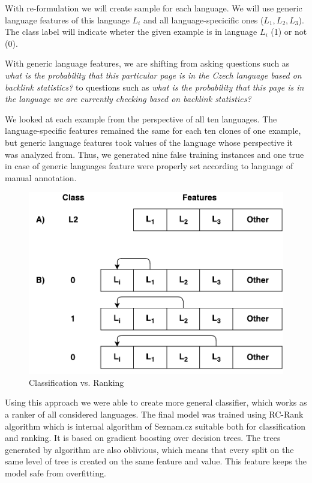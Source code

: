 \documentclass{acm_proc_article-sp}
\begin{document}
  With re-formulation we will create sample for each language.
  We will use generic language features of this language $L_i$ and all language-specicific
  ones ($L_1, L_2, L_3$). The class label will indicate wheter the given example is in language $L_i$ (1) or not (0).


  With generic language features, we are shifting from asking questions such as \textit{what is the probability that 
    this particular page is in the Czech language based on backlink statistics?} to questions 
    such as \textit{what is the probability that this page is in the language we are currently checking 
    based on backlink statistics?} 
 
 We looked at each example from the perspective of all ten languages. The 
  language-specific features remained the same for each ten clones of one example,
  but generic language features took values of the language whose perspective
  it was analyzed from.  Thus, we generated nine false training instances and 
  one true in case of generic languages feature were properly set according to 
  language of manual annotation.

  \begin{figure}
      \caption{Classification vs. Ranking} 
     \label{examples} 
 
 \vspace{0.5cm}
      \centering
      \includegraphics[scale=0.5]{multiclass.pdf}
 \end{figure}

  Using this approach we were able to create more general classifier, which works as a ranker of all considered languages.
  The final model was trained using RC-Rank algorithm which is internal algorithm of Seznam.cz suitable both for classification and ranking.
  It is based on gradient boosting over decision trees. The trees generated by algorithm are also oblivious, 
  which means that every split on the same level of tree is created on the same feature and value.
  This feature keeps the model safe from overfitting.
\end{document}
